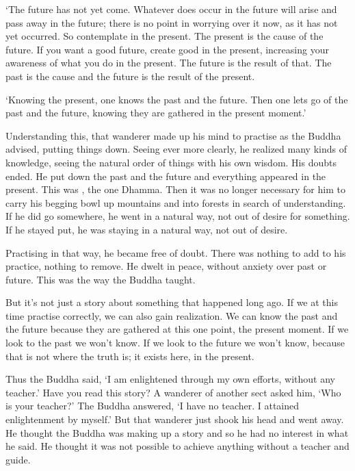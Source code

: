 `The future has not yet come. Whatever does occur in the future will arise and pass away in the future; there is no point in worrying over it now, as it has not yet occurred. So contemplate in the present. The present is the cause of the future. If you want a good future, create good in the present, increasing your awareness of what you do in the present. The future is the result of that. The past is the cause and the future is the result of the present. 

`Knowing the present, one knows the past and the future. Then one lets go of the past and the future, knowing they are gathered in the present moment.' 

Understanding this, that wanderer made up his mind to practise as the Buddha advised, putting things down. Seeing ever more clearly, he realized many kinds of knowledge, seeing the natural order of things with his own wisdom. His doubts ended. He put down the past and the future and everything appeared in the present. This was , the one Dhamma. Then it was no longer necessary for him to carry his begging bowl up mountains and into forests in search of understanding. If he did go somewhere, he went in a natural way, not out of desire for something. If he stayed put, he was staying in a natural way, not out of desire. 

Practising in that way, he became free of doubt. There was nothing to add to his practice, nothing to remove. He dwelt in peace, without anxiety over past or future. This was the way the Buddha taught. 

But it's not just a story about something that happened long ago. If we at this time practise correctly, we can also gain realization. We can know the past and the future because they are gathered at this one point, the present moment. If we look to the past we won't know. If we look to the future we won't know, because that is not where the truth is; it exists here, in the present. 

Thus the Buddha said, `I am enlightened through my own efforts, without any teacher.' Have you read this story? A wanderer of another sect asked him, `Who is your teacher?' The Buddha answered, `I have no teacher. I attained enlightenment by myself.' But that wanderer just shook his head and went away. He thought the Buddha was making up a story and so he had no interest in what he said. He thought it was not possible to achieve anything without a teacher and guide.

